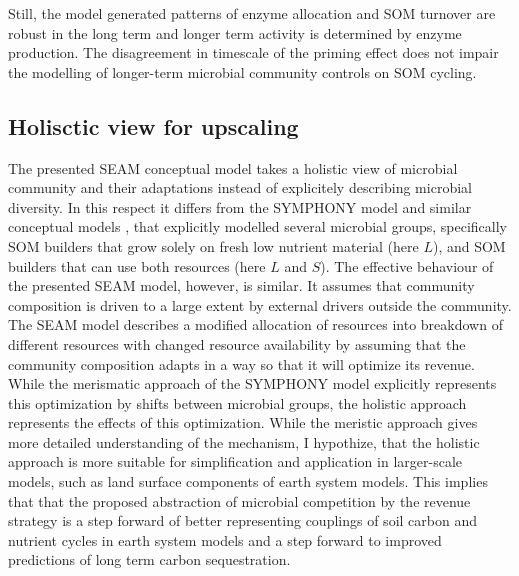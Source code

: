 Still, the model generated patterns of enzyme allocation and SOM turnover
are  robust in the long term and longer term activity is determined
by enzyme production. The disagreement in timescale of the
priming effect does not impair the modelling of longer-term microbial community
controls on SOM cycling.

\subsection{Holisctic view for upscaling
\label{sec:Holistic}} 

The presented SEAM conceptual model takes a holistic view \citep{Panikov10}
of microbial community and their adaptations instead of explicitely
describing microbial diversity.
In this respect it differs from the SYMPHONY model \citep{Perveen14} and similar conceptual
models \citep{Fontaine03}, that explicitly modelled several microbial groups,
specifically SOM builders that grow solely on fresh low nutrient material (here
$L$), and SOM builders that can use both resources (here $L$ and $S$). The
effective behaviour of the presented SEAM model, however, is similar. It assumes
that community composition is driven to a large extent by external drivers
outside the community. The SEAM model describes a modified allocation of
resources into breakdown of different resources with changed resource
availability by assuming that the community composition adapts in a way so that
it will optimize its revenue.
While the merismatic approach of the SYMPHONY model explicitly represents this
optimization by shifts between microbial groups, the holistic approach
represents the effects of this optimization.
While the meristic approach gives more detailed understanding of the mechanism,
I hypothize, that the holistic approach is more suitable for simplification
\citep{Wutzler13} and application in larger-scale models, such as land surface
components of earth system models.
This implies that that the proposed abstraction of microbial competition by the
revenue strategy is a step forward of better representing couplings of soil
carbon and nutrient cycles in earth system models and a step forward to improved
predictions of long term carbon sequestration.

